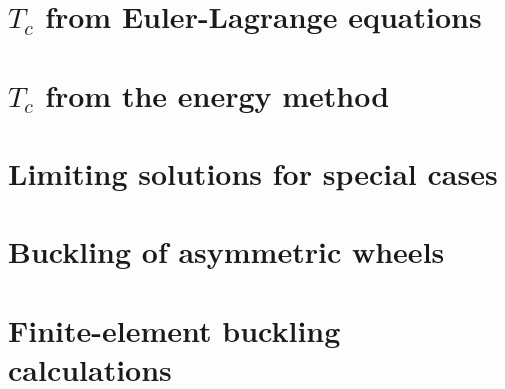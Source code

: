\documentclass[\rootdir/thesis.tex]{subfiles}
\begin{document}
\section{$T_c$ from Euler-Lagrange equations}

\section{$T_c$ from the energy method}

\section{Limiting solutions for special cases}

\section{Buckling of asymmetric wheels}

\section{Finite-element buckling calculations}
\end{document}
